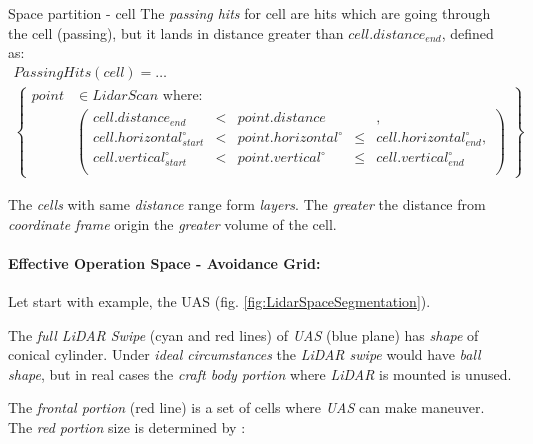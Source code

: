 \begin{definition}{Space partition - cell}
    \noindent The \emph{passing hits} for cell are hits which are going through the cell (passing), but it lands in distance greater than $cell.distance_{end}$, defined as:
    \begin{multline}\label{eq:passingHitsCell}
        Passing Hits(cell)=
        \dots\\
            \left \{
                \begin{aligned}
                point& \in Lidar Scan \text{ where}:\\
                    &\left(\begin{aligned}
                        cell.distance_{end}&<& point.distance &&,\\
                        cell.horizontal^\circ_{start} &<& point.horizontal^\circ &\le&  cell.horizontal^\circ_{end},\\
                        cell.vertical^\circ_{start} &<& point.vertical^\circ &\le& cell.vertical^\circ_{end}\\
                    \end{aligned}\right)
                \end{aligned}
            \right\}
    \end{multline}
\end{definition}

\begin{note}
    The \emph{cells} with same \emph{distance} range form \emph{layers}. The \emph{greater} the distance from \emph{coordinate frame} origin the \emph{greater} volume of the cell.     
\end{note}

\paragraph{Effective Operation Space - Avoidance Grid:} Let start with example, the UAS  (fig. \ref{fig:LidarSpaceSegmentation}). 



The \emph{full LiDAR Swipe} (cyan and red lines) of \emph{UAS} (blue plane) has \emph{shape} of conical cylinder. Under \emph{ideal circumstances} the \emph{LiDAR swipe} would have \emph{ball shape}, but in real cases the \emph{craft body portion} where \emph{LiDAR} is mounted is unused.

The \emph{frontal portion} (red line) is a set of cells where \emph{UAS} can make maneuver. The \emph{red portion} size is determined by \cite{zaiane2002clustering}:

